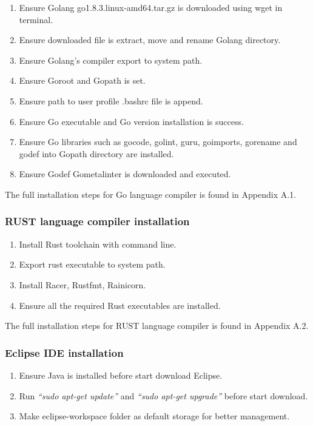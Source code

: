 \begin{enumerate}[topsep=0pt,itemsep=-1ex,partopsep=1ex,parsep=1.5ex]
	\item Ensure Golang go1.8.3.linux-amd64.tar.gz is downloaded using wget in terminal. 
	\item Ensure downloaded file is extract, move and rename Golang directory. 
	\item Ensure Golang’s compiler export to system path. 
	\item Ensure Goroot and Gopath is set. 
	\item Ensure path to user profile .bashrc file is append. 
	\item Ensure Go executable and Go version installation is success. 
	\item Ensure Go libraries such as gocode, golint, guru, goimports, gorename and godef into Gopath directory are installed. 
	\item Ensure Godef Gometalinter is downloaded and executed. 
	
\end{enumerate}

The full installation steps for Go language compiler is found in Appendix A.1.
\pagebreak

\subsubsection{RUST language compiler installation}

\begin{enumerate}[topsep=0pt,itemsep=-1ex,partopsep=1ex,parsep=1.5ex]
    \item Install Rust toolchain with command line. 
    \item Export rust executable to system path. 
    \item Install Racer, Rustfmt, Rainicorn.
    \item Ensure all the required Rust executables are installed. 
	
\end{enumerate}

The full installation steps for RUST language compiler is found in Appendix A.2.

\subsubsection{Eclipse IDE installation}

\begin{enumerate}[topsep=0pt,itemsep=-1ex,partopsep=1ex,parsep=1.5ex]
    \item Ensure Java is installed before start download Eclipse.
    \item Run \textit{“sudo apt-get update”} and \textit{“sudo apt-get upgrade”} before start download. 
    \item Make eclipse-workspace folder as default storage for better management. 

\end{enumerate}

